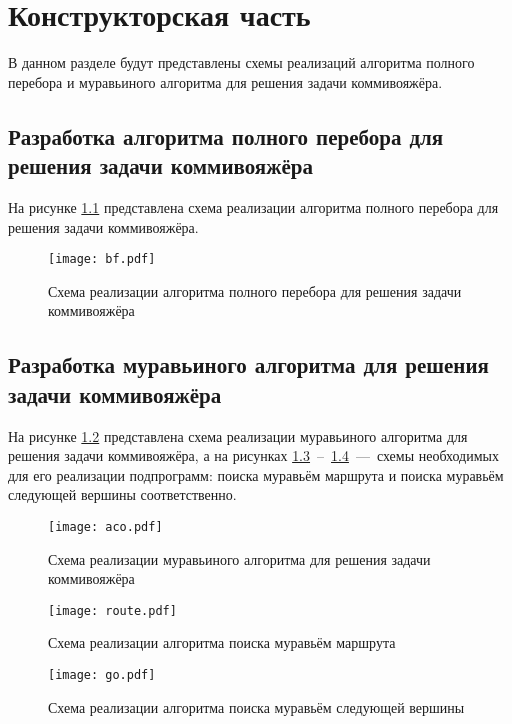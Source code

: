 \chapter{Конструкторская часть}

В данном разделе будут представлены схемы реализаций алгоритма полного перебора и муравьиного алгоритма для решения задачи коммивояжёра.

\section{Разработка алгоритма полного перебора для решения задачи коммивояжёра}
На рисунке \ref{img:bf} представлена схема реализации алгоритма полного перебора для решения задачи коммивояжёра. 

\begin{figure}[h!]
    \centering
    \texttt{[image: bf.pdf]}
    \caption{Схема реализации алгоритма полного перебора для решения задачи коммивояжёра}
    \label{img:bf}
\end{figure}

\section{Разработка муравьиного алгоритма для решения задачи коммивояжёра}
На рисунке \ref{img:aco} представлена схема реализации муравьиного алгоритма для решения задачи коммивояжёра, а на рисунках \ref{img:route}~--~\ref{img:go}~---~схемы необходимых для его реализации подпрограмм: поиска муравьём маршрута и поиска муравьём следующей вершины соответственно.

\begin{figure}[h!]
    \centering
    \texttt{[image: aco.pdf]}
    \caption{Схема реализации муравьиного алгоритма для решения задачи коммивояжёра}
    \label{img:aco}
\end{figure}

\newpage

\begin{figure}[h!]
    \centering
    \texttt{[image: route.pdf]}
    \caption{Схема реализации алгоритма поиска муравьём маршрута}
    \label{img:route}
\end{figure}

\newpage

\begin{figure}[h!]
    \centering
    \texttt{[image: go.pdf]}
    \caption{Схема реализации алгоритма поиска муравьём следующей вершины}
    \label{img:go}
\end{figure}

